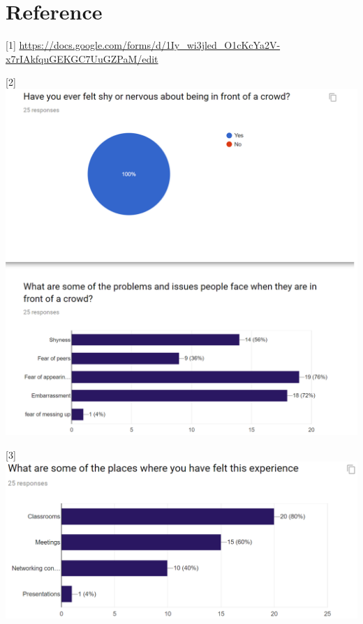 \documentclass[12pt]{article}
\begin{document}
\section{Reference}
\begin{center}
[1] \url{https://docs.google.com/forms/d/1Iy_wi3jled_O1cKcYa2V-x7rIAkfquGEKGC7UuGZPaM/edit}


[2] \includegraphics[width=\textwidth]{Assignments_reference_2}


[3] \includegraphics[width=\textwidth]{Assignments_reference_3}



\end{center}
\end{document}
